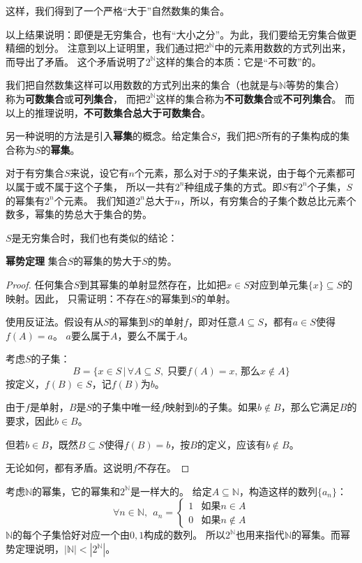 \documentclass[12pt,UTF8]{ctexbook}
\begin{document}
这样，我们得到了一个严格“大于”自然数集的集合。

以上结果说明：即便是无穷集合，也有“大小之分”。为此，我们要给无穷集合做更精细的划分。
注意到以上证明里，我们通过把$2^\mathbb{N}$中的元素用数数的方式列出来，而导出了矛盾。
这个矛盾说明了$2^\mathbb{N}$这样的集合的本质：它是“不可数”的。

我们把自然数集这样可以用数数的方式列出来的集合（也就是与$\mathbb{N}$等势的集合）
称为\textbf{可数集合}或\textbf{可列集合}，
而把$2^\mathbb{N}$这样的集合称为\textbf{不可数集合}或\textbf{不可列集合}。
而以上的推理说明，\textbf{不可数集合总大于可数集合}。

另一种说明的方法是引入\textbf{幂集}的概念。给定集合$S$，我们把$S$所有的子集构成的集合称为$S$的\textbf{幂集}。

对于有穷集合$S$来说，设它有$n$个元素，那么对于$S$的子集来说，由于每个元素都可以属于或不属于这个子集，
所以一共有$2^n$种组成子集的方式。即$S$有$2^n$个子集，$S$的幂集有$2^n$个元素。
我们知道$2^n$总大于$n$，所以，有穷集合的子集个数总比元素个数多，幂集的势总大于集合的势。

$S$是无穷集合时，我们也有类似的结论：
\begin{tm}{\textbf{幂势定理}}
    集合$S$的幂集的势大于$S$的势。
\end{tm}

\begin{proof}
    任何集合$S$到其幂集的单射显然存在，比如把$x\in S$对应到单元集$\{x\}\subseteq S$的映射。因此，
    只需证明：不存在$S$的幂集到$S$的单射。
    
    使用反证法。假设有从$S$的幂集到$S$的单射$f$，即对任意$A\subseteq S$，都有$a\in S$使得$f(A) = a$。
    $a$要么属于$A$，要么不属于$A$。

    考虑$S$的子集：
    $$ B = \{x\in S \, | \, \forall A\subseteq S,\;\mbox{只要} f(A) = x,\,\mbox{那么} x\notin A\}$$
    按定义，$f(B)\in S$，记$f(B)$为$b$。
    
    由于$f$是单射，$B$是$S$的子集中唯一经$f$映射到$b$的子集。如果$b\notin B$，那么它满足$B$的要求，因此$b\in B$。

    但若$b\in B$，既然$B\subseteq S$使得$f(B)=b$，按$B$的定义，应该有$b \notin B$。

    无论如何，都有矛盾。这说明$f$不存在。

\end{proof}

考虑$\mathbb{N}$的幂集，它的幂集和$2^\mathbb{N}$是一样大的。
给定$A\subseteq \mathbb{N}$，构造这样的数列$\{a_n\}$：
$$\forall n \in \mathbb{N},\;\,
a_n = \begin{cases}
    1 & \mbox{如果} n \in A \\
    0 & \mbox{如果} n \notin A
\end{cases}
$$
$\mathbb{N}$的每个子集恰好对应一个由$0,1$构成的数列。
所以$2^\mathbb{N}$也用来指代$\mathbb{N}$的幂集。而幂势定理说明，$|\mathbb{N}| < |2^\mathbb{N}|$。
\end{document}
